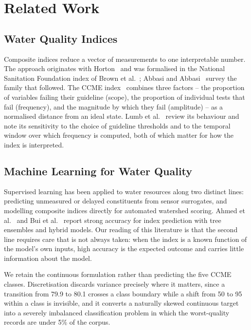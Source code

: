 \section{Related Work}
\label{sec:related}

\subsection{Water Quality Indices}
Composite indices reduce a vector of measurements to one interpretable number. The
approach originates with Horton~\cite{horton1965} and was formalised in the National
Sanitation Foundation index of Brown et al.~\cite{brown1970wqi}; Abbasi and
Abbasi~\cite{abbasi2012wqi} survey the family that followed. The CCME
index~\cite{ccme2001wqi} combines three factors -- the proportion of variables failing
their guideline (scope), the proportion of individual tests that fail (frequency), and
the magnitude by which they fail (amplitude) -- as a normalised distance from an ideal
state. Lumb et al.~\cite{lumb2011review} review its behaviour and note its sensitivity to
the choice of guideline thresholds and to the temporal window over which frequency is
computed, both of which matter for how the index is interpreted.

\subsection{Machine Learning for Water Quality}
Supervised learning has been applied to water resources along two distinct lines:
predicting unmeasured or delayed constituents from sensor surrogates, and modelling
composite indices directly for automated watershed scoring. Ahmed et
al.~\cite{ahmed2019ml} and Bui et al.~\cite{bui2020hybrid} report strong accuracy for
index prediction with tree ensembles and hybrid models. Our reading of this literature is
that the second line requires care that is not always taken: when the index is a known
function of the model's own inputs, high accuracy is the expected outcome and carries
little information about the model.

We retain the continuous formulation rather than predicting the five CCME classes.
Discretisation discards variance precisely where it matters, since a transition from
79.9 to 80.1 crosses a class boundary while a shift from 50 to 95 within a class is
invisible, and it converts a naturally skewed continuous target into a severely imbalanced
classification problem in which the worst-quality records are under 5\% of the corpus.

